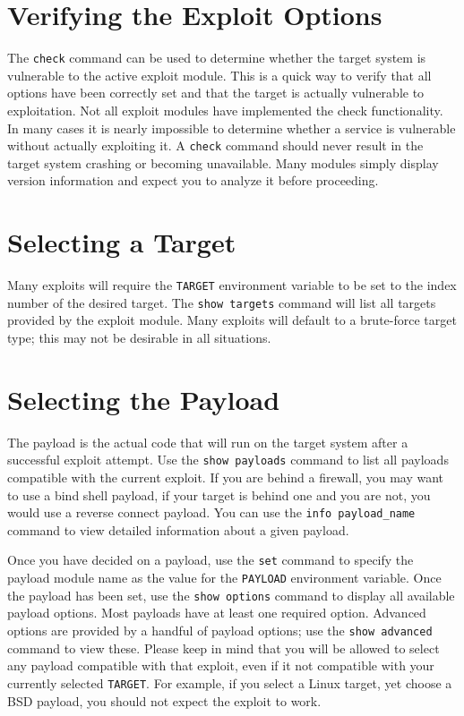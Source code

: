 \documentclass{report}
\begin{document}
	\section{Verifying the Exploit Options}
\par	
The \texttt{check} command can be used to determine whether the target system is
vulnerable to the active exploit module. This is a quick way to verify that all
options have been correctly set and that the target is actually vulnerable to
exploitation. Not all exploit modules have implemented the check functionality.
In many cases it is nearly impossible to determine whether a service is
vulnerable without actually exploiting it. A \texttt{check} command should never result
in the target system crashing or becoming unavailable. Many modules simply
display version information and expect you to analyze it before proceeding.  


	\section{Selecting a Target}
\par
Many exploits will require the \texttt{TARGET} environment variable to be set to the
index number of the desired target. The \texttt{show targets} command will list all
targets provided by the exploit module. Many exploits will default to a
brute-force target type; this may not be desirable in all situations. 

	\section{Selecting the Payload}
\par	
The payload is the actual code that will run on the target system after a
successful exploit attempt. Use the \texttt{show payloads} command to list all payloads
compatible with the current exploit. If you are behind a firewall, you may want
to use a bind shell payload, if your target is behind one and you are not, you
would use a reverse connect payload. You can use the \texttt{info payload\_name} command
to view detailed information about a given payload.  

\par
Once you have decided on a payload, use the \texttt{set} command to specify the payload
module name as the value for the \texttt{PAYLOAD} environment variable. Once the payload
has been set, use the \texttt{show options} command to display all available payload
options. Most payloads have at least one required option. Advanced options are
provided by a handful of payload options; use the \texttt{show advanced} command to view
these. Please keep in mind that you will be allowed to select any payload
compatible with that exploit, even if it not compatible with your currently
selected \texttt{TARGET}. For example, if you select a Linux target, yet choose
a BSD payload, you should not expect the exploit to work.
\end{document}
